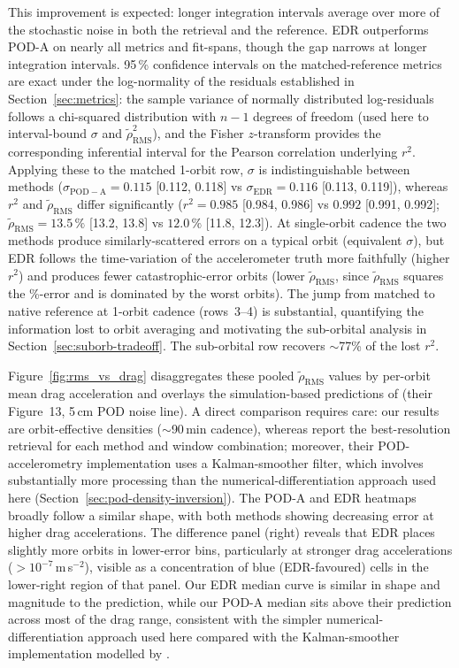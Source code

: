 \documentclass{agujournal2019}
\begin{document}
This improvement is expected: longer integration intervals average over more
of the stochastic noise in both the retrieval and the reference.
EDR outperforms POD-A on nearly all metrics and fit-spans, though the gap
narrows at longer integration intervals. 95\,\% confidence intervals on the
matched-reference metrics are exact under the log-normality of the residuals
established in Section~\ref{sec:metrics}: the sample variance of normally
distributed log-residuals follows a chi-squared distribution with $n-1$
degrees of freedom (used here to interval-bound $\sigma$ and
$\tilde{\rho}_{\mathrm{RMS}}^{2}$), and the Fisher $z$-transform provides the
corresponding inferential interval for the Pearson correlation underlying
$r^{2}$. Applying these to the matched 1-orbit row, $\sigma$ is indistinguishable
between methods ($\sigma_{\mathrm{POD-A}} = 0.115$ [0.112, 0.118] vs
$\sigma_{\mathrm{EDR}} = 0.116$ [0.113, 0.119]), whereas $r^{2}$ and
$\tilde{\rho}_{\mathrm{RMS}}$ differ significantly ($r^{2} = 0.985$ [0.984, 0.986]
vs $0.992$ [0.991, 0.992]; $\tilde{\rho}_{\mathrm{RMS}} = 13.5\,\%$ [13.2, 13.8]
vs $12.0\,\%$ [11.8, 12.3]). At single-orbit cadence the two methods produce
similarly-scattered errors on a typical orbit (equivalent $\sigma$), but EDR
follows the time-variation of the accelerometer truth more faithfully (higher
$r^{2}$) and produces fewer catastrophic-error orbits (lower
$\tilde{\rho}_{\mathrm{RMS}}$, since $\tilde{\rho}_{\mathrm{RMS}}$ squares the
\%-error and is dominated by the worst orbits).
The jump from matched to native
reference at 1-orbit cadence (rows~3--4) is substantial, quantifying
the information lost to orbit averaging and motivating the sub-orbital
analysis in Section~\ref{sec:suborb-tradeoff}. The sub-orbital row recovers $\sim$77\% of the
lost $r^{2}$.

Figure~\ref{fig:rms_vs_drag} disaggregates these pooled
$\tilde{\rho}_{\text{RMS}}$ values by per-orbit mean drag acceleration and
overlays the simulation-based predictions of 
(their Figure~13, 5\,cm POD noise line). A direct comparison
requires care: our results are orbit-effective densities
($\sim$90\,min cadence), whereas  report the
best-resolution retrieval for each method and window combination; moreover,
their POD-accelerometry implementation uses a Kalman-smoother filter, which
involves substantially more processing than the numerical-differentiation
approach used here (Section~\ref{sec:pod-density-inversion}). The POD-A and EDR heatmaps broadly follow a similar shape,
with both methods showing decreasing error at higher drag accelerations.
The difference panel (right) reveals that EDR places slightly more orbits
in lower-error bins, particularly at stronger drag accelerations
($>10^{-7}$\,m\,s$^{-2}$), visible as a concentration of blue
(EDR-favoured) cells in the lower-right region of that panel.
Our EDR median curve is similar in shape and magnitude to the
 prediction, while our POD-A median sits
above their prediction across most of the drag range, consistent with
the simpler numerical-differentiation approach used here compared with
the Kalman-smoother implementation modelled by
.
\end{document}
